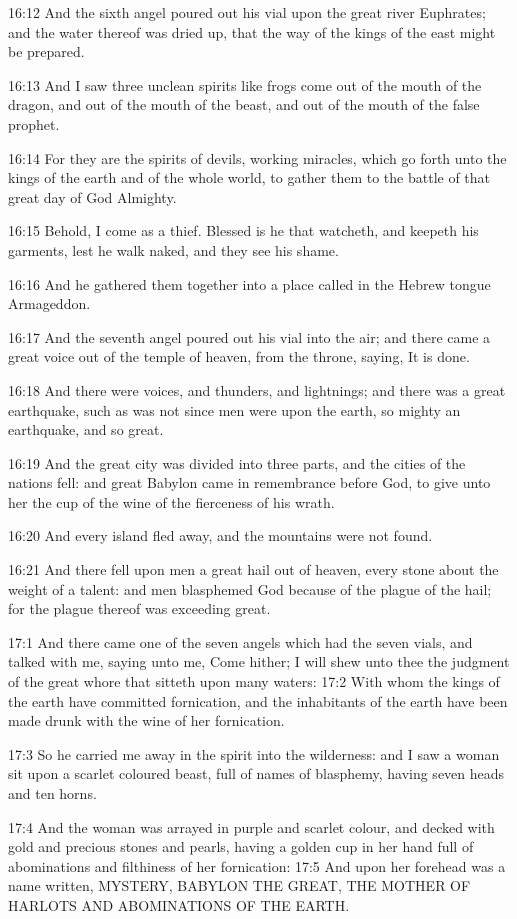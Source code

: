 16:12 And the sixth angel poured out his vial upon the great river Euphrates; and the water thereof was dried up, that the way of the kings of the east might be prepared.

16:13 And I saw three unclean spirits like frogs come out of the mouth of the dragon, and out of the mouth of the beast, and out of the mouth of the false prophet.

16:14 For they are the spirits of devils, working miracles, which go forth unto the kings of the earth and of the whole world, to gather them to the battle of that great day of God Almighty.

16:15 Behold, I come as a thief. Blessed is he that watcheth, and keepeth his garments, lest he walk naked, and they see his shame.

16:16 And he gathered them together into a place called in the Hebrew tongue Armageddon.

16:17 And the seventh angel poured out his vial into the air; and there came a great voice out of the temple of heaven, from the throne, saying, It is done.

16:18 And there were voices, and thunders, and lightnings; and there was a great earthquake, such as was not since men were upon the earth, so mighty an earthquake, and so great.

16:19 And the great city was divided into three parts, and the cities of the nations fell: and great Babylon came in remembrance before God, to give unto her the cup of the wine of the fierceness of his wrath.

16:20 And every island fled away, and the mountains were not found.

16:21 And there fell upon men a great hail out of heaven, every stone about the weight of a talent: and men blasphemed God because of the plague of the hail; for the plague thereof was exceeding great.

17:1 And there came one of the seven angels which had the seven vials, and talked with me, saying unto me, Come hither; I will shew unto thee the judgment of the great whore that sitteth upon many waters: 17:2 With whom the kings of the earth have committed fornication, and the inhabitants of the earth have been made drunk with the wine of her fornication.

17:3 So he carried me away in the spirit into the wilderness: and I saw a woman sit upon a scarlet coloured beast, full of names of blasphemy, having seven heads and ten horns.

17:4 And the woman was arrayed in purple and scarlet colour, and decked with gold and precious stones and pearls, having a golden cup in her hand full of abominations and filthiness of her fornication: 17:5 And upon her forehead was a name written, MYSTERY, BABYLON THE GREAT, THE MOTHER OF HARLOTS AND ABOMINATIONS OF THE EARTH.

